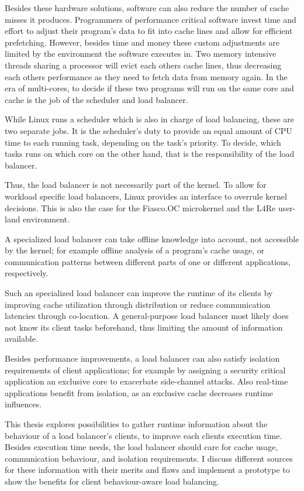 Besides these hardware solutions, software can also reduce the number of cache
misses it produces.
Programmers of performance critical software invest time and effort to adjust
their program's data to fit into cache lines and allow for efficient prefetching.
However, besides time and money these custom adjustments are limited by the
environment the software executes in.
Two memory intensive threads sharing a processor will evict each others
cache lines, thus decreasing each others performance as they need to fetch
data from memory again.
In the era of multi-cores, to decide if these two programs will run on
the same core and cache is the job of the scheduler and load balancer.

While Linux runs a scheduler which is also in charge of load balancing, these
are two separate jobs.
It is the scheduler's duty to provide an equal amount of CPU time to each
running task, depending on the task's priority.
To decide, which tasks runs on which core on the other hand,
that is the responsibility of the load balancer.

Thus, the load balancer is not necessarily part of the kernel.
To allow for workload specific load balancers, Linux provides an interface to
overrule kernel decisions.
This is also the case for the Fiasco.OC microkernel and the L4Re user-land
environment.

A specialized load balancer can take offline knowledge into account, not
accessible by the kernel;
for example offline analysis of a program's cache usage, or communication
patterns between different parts of one or different applications,
respectively.

Such an specialized load balancer can improve the runtime of its clients by
improving cache utilization through distribution or reduce communication latencies
through co-location.
A general-purpose load balancer most likely does not know its client tasks
beforehand, thus limiting the amount of information available.

Besides performance improvements, a load balancer can also satisfy isolation
requirements of client applications; for example by assigning a security
critical application an exclusive core to exacerbate side-channel attacks.
Also real-time applications benefit from isolation, as an exclusive cache
decreases runtime influences.

This thesis explores possibilities to gather runtime information about the
behaviour of a load balancer's clients, to improve each clients execution time.
Besides execution time needs, the load balancer should care for cache usage,
communication behaviour, and isolation requirements.
I discuss different sources for these information with their merits and flaws and
implement a prototype to show the benefits for client behaviour-aware load
balancing.
\\

